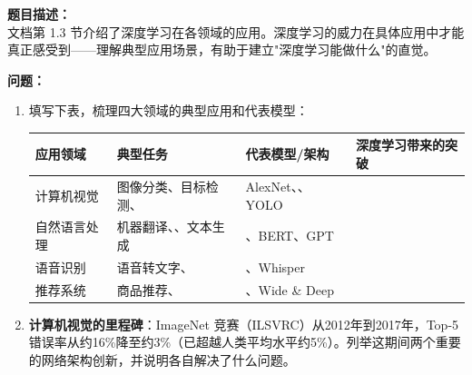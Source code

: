 \documentclass[a4paper,11pt]{ctexart}
\begin{document}
\begin{problembox}
    \textbf{题目描述：}\\
    文档第 1.3 节介绍了深度学习在各领域的应用。深度学习的威力在具体应用中才能真正感受到——理解典型应用场景，有助于建立"深度学习能做什么"的直觉。

    \vspace{0.3cm}
    \textbf{问题：}
    \begin{enumerate}[(1)]
        \item 填写下表，梳理四大领域的典型应用和代表模型：

        \begin{center}
        \begin{tabular}{p{2.5cm} p{3.5cm} p{2.5cm} p{3.0cm}}
            \toprule
            应用领域 & 典型任务 & 代表模型/架构 & 深度学习带来的突破 \\
            \midrule
            计算机视觉 & 图像分类、目标检测、\underline{\hspace{1.5cm}} & AlexNet、\underline{\hspace{1.5cm}}、YOLO & \underline{\hspace{2.5cm}} \\[1.5em]
            自然语言处理 & 机器翻译、\underline{\hspace{1.5cm}}、文本生成 & \underline{\hspace{1.5cm}}、BERT、GPT & \underline{\hspace{2.5cm}} \\[1.5em]
            语音识别 & 语音转文字、\underline{\hspace{1.5cm}} & \underline{\hspace{1.5cm}}、Whisper & \underline{\hspace{2.5cm}} \\[1.5em]
            推荐系统 & 商品推荐、\underline{\hspace{1.5cm}} & \underline{\hspace{1.5cm}}、Wide \& Deep & \underline{\hspace{2.5cm}} \\
            \bottomrule
        \end{tabular}
        \end{center}

        \item \textbf{计算机视觉的里程碑}：ImageNet 竞赛（ILSVRC）从2012年到2017年，Top-5 错误率从约16\%降至约3\%（已超越人类平均水平约5\%）。列举这期间两个重要的网络架构创新，并说明各自解决了什么问题。


\end{enumerate}
\end{problembox}
\end{document}
